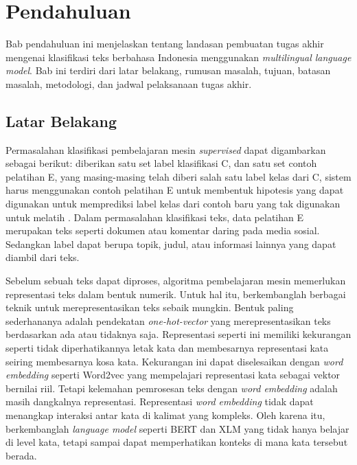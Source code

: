 \chapter{Pendahuluan}

Bab pendahuluan ini menjelaskan tentang landasan pembuatan tugas akhir mengenai klasifikasi teks berbahasa Indonesia menggunakan \textit{multilingual language model}. Bab ini terdiri dari latar belakang, rumusan masalah, tujuan, batasan masalah, metodologi, dan jadwal pelaksanaan tugas akhir.

\section{Latar Belakang}

Permasalahan klasifikasi pembelajaran mesin \textit{supervised} dapat digambarkan sebagai berikut: diberikan satu set label klasifikasi C, dan satu set contoh pelatihan E, yang masing-masing telah diberi salah satu label kelas dari C, sistem harus menggunakan contoh pelatihan E untuk membentuk hipotesis yang dapat digunakan untuk memprediksi label kelas dari contoh baru yang tak digunakan untuk melatih \parencite{mitchell_machine_1997}. Dalam permasalahan klasifikasi teks, data pelatihan E merupakan teks seperti dokumen atau komentar daring pada media sosial. Sedangkan label dapat berupa topik, judul, atau informasi lainnya yang dapat diambil dari teks.

Sebelum sebuah teks dapat diproses, algoritma pembelajaran mesin memerlukan representasi teks dalam bentuk numerik. Untuk hal itu, berkembanglah berbagai teknik untuk merepresentasikan teks sebaik mungkin. Bentuk paling sederhananya adalah pendekatan \textit{one-hot-vector} yang merepresentasikan teks berdasarkan ada atau tidaknya saja. Representasi seperti ini memiliki kekurangan seperti tidak diperhatikannya letak kata dan membesarnya representasi kata seiring membesarnya kosa kata. Kekurangan ini dapat diselesaikan dengan \textit{word embedding} seperti Word2vec \parencite{MikolovWord2vec} yang mempelajari representasi kata sebagai vektor bernilai riil. Tetapi kelemahan pemrosesan teks dengan \textit{word embedding} adalah masih dangkalnya representasi. Representasi \textit{word embedding} tidak dapat menangkap interaksi antar kata di kalimat yang kompleks. Oleh karena itu, berkembanglah \textit{language model} seperti BERT \parencite{Devlin_Chang_Lee_Toutanova_2019} dan XLM \parencite{LampleConneau2019} yang tidak hanya belajar di level kata, tetapi sampai dapat memperhatikan konteks di mana kata tersebut berada. 


